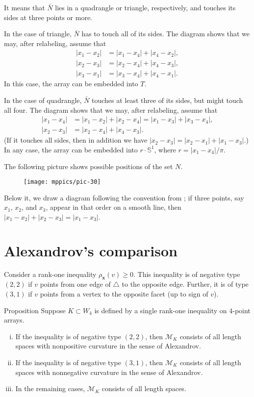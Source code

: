 \documentclass[a4paper,10pt]{article}
\begin{document}
It means that $\bar N$ lies in a quadrangle or triangle, respectively, and touches its sides at three points or more.

In the case of triangle, $\bar N$ has to touch all of its sides.
The diagram shows that we may, after relabeling, assume that
\begin{align*}
|x_1-x_2|&=|x_1-x_4|+|x_4-x_2|,
\\
|x_2-x_3|&=|x_2-x_4|+|x_4-x_3|,
\\
|x_3-x_1|&=|x_3-x_4|+|x_4-x_1|.
\end{align*}
In this case, the array can be embedded into $T$.

In the case of quadrangle, $\bar N$ touches at least three of its sides, but might touch all four.
The diagram shows that we may, after relabeling, assume that
\begin{align*}
|x_1-x_4|&=|x_1-x_2|+|x_2-x_4|=|x_1-x_3|+|x_3-x_4|,
\\
|x_2-x_3|&=|x_2-x_4|+|x_4-x_3|.
\end{align*}
(If it touches all sides, then in addition we have $|x_2-x_3|=|x_2-x_1|+|x_1-x_3|$.)
In any case, the array can be embedded into $r\cdot \mathbb{S}^1$, where $r=|x_1-x_4|/\pi$.
\qeds

The following picture shows possible positions of the set $N$.
\begin{figure}[h!]
\centering
\vskip-0mm
\texttt{[image: mppics/pic-30]}
\vskip-0mm
\end{figure}
Below it, we draw a diagram following the convention from \cite{lebedeva-petrunin-2010};
if three points, say $x_1$, $x_2$, and $x_3$, appear in that order on a smooth line, then $|x_1-x_2|+|x_2-x_3|=|x_1-x_3|$.


\section{Alexandrov's comparison}\label{Alexandrov's comparison}

Consider a rank-one inequality $\rho_{\bm{x}}(v)\ge 0$.
This inequality is of negative type $(2,2)$ if $v$ points from one edge of $\triangle$ to the opposite edge.
Further, it is of type $(3,1)$ if $v$ points from a vertex to the opposite facet (up to sign of $v$).

\begin{thm}{Proposition}\label{prop:Alexandrov's comparison}
Suppose $K\subset W_4$ is defined by a single rank-one inequality on $4$-point arrays.
\begin{enumerate}[(i)]
\item If the inequality is of negative type $(2,2)$, then $\mathcal{M}_K$ consists of all length spaces with nonpositive curvature in the sense of Alexandrov.
\item \label{prop:Alexandrov's comparison:(3,1)} If the inequality is of negative type $(3,1)$, then $\mathcal{M}_K$ consists of all length spaces with nonnegative curvature in the sense of Alexandrov.
\item In the remaining cases, $\mathcal{M}_K$ consists of all length spaces.
\end{enumerate}

\end{thm}
\end{document}
